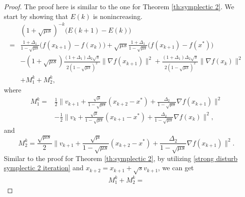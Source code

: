 \documentclass[10pt,a4paper]{amsart}
\begin{document}
\begin{proof}
    {The proof here is similar to the one for Theorem \ref{th:symplectic 2}. We start by showing that $E(k)$ is nonincreasing. 
        \begin{equation}
        \label{eq: diffEk in modified symplectic discretization}
        \begin{aligned}
        &(1+\sqrt{\mu s})^{-k}\big(E(k+1)-E(k)\big)\\
        =&\frac{1+\Delta_1}{1-\sqrt{\mu s}}\big(f(x_{k+1})-f(x_k)\big)+\sqrt{\mu s}\frac{1+\Delta_1}{1-\sqrt{\mu s}}\big(f(x_{k+1})-f(x^*)\big)\\
		&-(1+\sqrt{\mu s})\frac{(1+\Delta_1)\Delta_2\sqrt{s}}{2(1-\sqrt{\mu s})^2}\|\nabla f(x_{k+1})\|^2+\frac{(1+\Delta_1)\Delta_2\sqrt{s}}{2(1-\sqrt{\mu s})^2}\|\nabla f(x_k)\|^2\\
        &+M_1^k+M_2^k,
        \end{aligned}
        \end{equation}
        where 
        \begin{equation*}
        \begin{aligned}
            M_1^k={}&\frac{1}{2}\|v_{k+1}+\frac{\sqrt{\mu}}{1-\sqrt{\mu s}}(x_{k+2} -x^*)+\frac{\Delta_2}{1-\sqrt{\mu s}}\nabla f(x_{k+1})\|^2 \\
            {}&-\frac{1}{2}\|v_k+\frac{\sqrt{\mu}}{1-\sqrt{\mu s}}(x_{k+1}-x^*)+\frac{\Delta_2}{1-\sqrt{\mu s}}\nabla f(x_k)\|^2,
        \end{aligned}
        \end{equation*}
        and 
        \begin{equation*}
            M_2^k=\frac{\sqrt{\mu s}}{2}\|v_{k+1}+\frac{\sqrt{\mu}}{1-\sqrt{\mu s}}(x_{k+2}-x^*)+\frac{\Delta_2}{1-\sqrt{\mu s}}\nabla f(x_{k+1})\|^2.
        \end{equation*}
        Similar to the proof for Theorem \ref{th:symplectic 2}, 
        by utilizing \eqref{strong disturb symplectic 2 iteration} and $x_{k+2}=x_{k+1}+\sqrt{s}v_{k+1}$, we can get
        \begin{align*}
        M_1^k+M_2^k = 

\end{align*}}
\end{proof}
\end{document}
